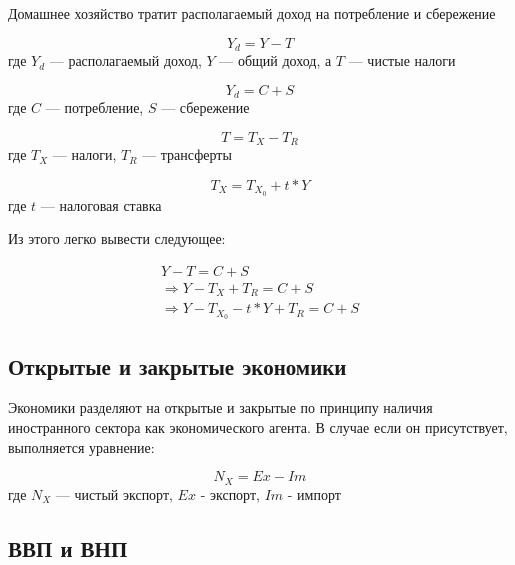 \documentclass{article}
\begin{document}
    Домашнее хозяйство тратит располагаемый доход на потребление и сбережение

    \begin{equation}
        Y_{d} = Y - T
    \end{equation}
    где $Y_{d}$ --- располагаемый доход, $Y$ --- общий доход, а $T$ --- чистые налоги

    \quad

    \begin{equation}
        Y_{d} = C + S
    \end{equation}
    где $C$ --- потребление, $S$ --- сбережение

    \quad

    \begin{equation}
        T = T_{X} - T_{R}
    \end{equation}
    где $T_{X}$ --- налоги, $T_{R}$ --- трансферты

    \quad

    \begin{equation}
        T_{X} = T_{X_{0}} + t * Y
    \end{equation}
    где $t$ --- налоговая ставка

    \quad

    Из этого легко вывести следующее:

    \quad

    \begin{gather*}
        Y - T = C + S \\
        \Rightarrow Y - T_{X} + T_{R} = C + S \\
        \Rightarrow Y - T_{X_{0}} - t * Y + T_{R} = C + S
    \end{gather*}

    \subsection{Открытые и закрытые экономики}

    Экономики разделяют на открытые и закрытые по принципу наличия иностранного сектора как экономического агента. В случае если он присутствует, выполняется уравнение:

    \begin{equation}
        N_{X} = Ex - Im
    \end{equation}
    где $N_{X}$ --- чистый экспорт, $Ex$ - экспорт, $Im$ - импорт

    \subsection{ВВП и ВНП}
\end{document}
